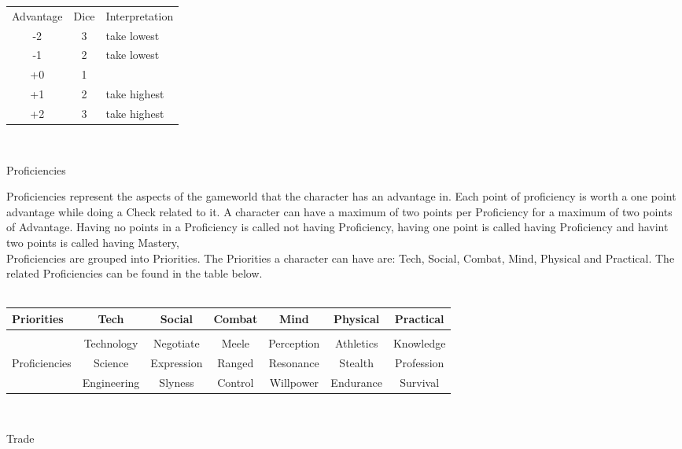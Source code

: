 \documentclass{article}
\newcommand{\subhline}[1]{\begin{center}\large #1 \normalsize \end{center}}
\begin{document}
\begin{tabular}{c|c|l}
Advantage & Dice & Interpretation \\
-2& 3& take lowest\\
\hline
-1& 2& take lowest\\
\hline
+0& 1&\\
\hline
+1& 2& take highest\\
\hline
+2& 3& take highest\\
\end{tabular}\\

\subhline{Proficiencies}

Proficiencies represent the aspects of the gameworld that the character has an advantage in.
Each point of proficiency is worth a one point advantage while doing a Check related to it.
A character can have a maximum of two points per Proficiency for a maximum of two points of Advantage. Having no points in a Proficiency is called not having Proficiency, having one point is called having Proficiency and havint two points is called having Mastery,\\
Proficiencies are grouped into Priorities. The Priorities a character can have are: Tech, Social, Combat, Mind, Physical and Practical.
The related Proficiencies can be found in the table below.\\\\

\begin{tabular}{l||cccccc}
Priorities&Tech& Social& Combat& Mind& Physical & Practical\\\hline
\\&Technology&Negotiate&Meele&Perception&Athletics&Knowledge\\
Proficiencies&Science&Expression&Ranged&Resonance&Stealth&Profession\\
&Engineering&Slyness&Control&Willpower&Endurance&Survival\\
\end{tabular}\\

\subhline{Trade}
\end{document}
